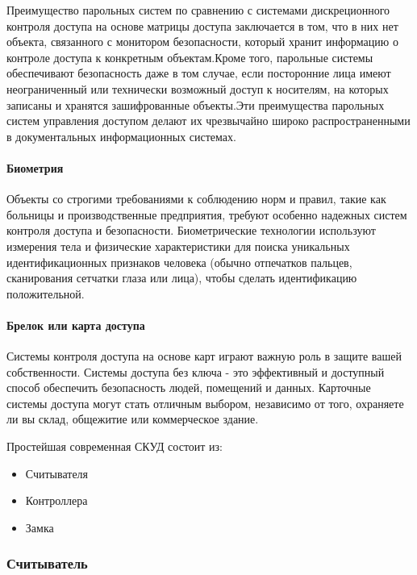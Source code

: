 Преимущество парольных систем по сравнению с системами дискреционного контроля доступа на основе матрицы доступа заключается в том, что в них нет объекта, связанного с монитором безопасности, который хранит информацию о контроле доступа к конкретным объектам.Кроме того, парольные системы обеспечивают безопасность даже в том случае, если посторонние лица имеют неограниченный или технически возможный доступ к носителям, на которых записаны и хранятся зашифрованные объекты.Эти преимущества парольных систем управления доступом делают их чрезвычайно широко распространенными в документальных информационных системах.

\paragraph{Биометрия}

Объекты со строгими требованиями к соблюдению норм и правил, такие как больницы и производственные предприятия, требуют особенно надежных систем контроля доступа и безопасности. Биометрические технологии используют измерения тела и физические характеристики для поиска уникальных идентификационных признаков человека (обычно отпечатков пальцев, сканирования сетчатки глаза или лица), чтобы сделать идентификацию положительной. 

\paragraph{Брелок или карта доступа}

Системы контроля доступа на основе карт играют важную роль в защите вашей собственности. Системы доступа без ключа - это эффективный и доступный способ обеспечить безопасность людей, помещений и данных. Карточные системы доступа могут стать отличным выбором, независимо от того, охраняете ли вы склад, общежитие или коммерческое здание.

Простейшая современная СКУД состоит из:

\begin{itemize}
	\item Считывателя
	\item Контроллера
	\item Замка
\end{itemize}

\subsubsection {Считыватель}

